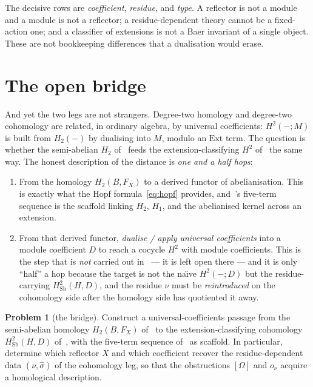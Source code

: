 \documentclass[11pt]{article}
\theoremstyle{definition}
\newtheorem{problem}[theorem]{Problem}
\newcommand{\Sb}{\mathrm{Sb}}
\newcommand{\shat}{\widehat{\sigma}}
\begin{document}
The decisive rows are \emph{coefficient}, \emph{residue}, and \emph{type}. A reflector is not
a module and a module is not a reflector; a residue-dependent theory cannot be a
fixed-action one; and a classifier of extensions is not a Baer invariant of a single object.
These are not bookkeeping differences that a dualisation would erase.

\section{The open bridge}\label{sec:bridge}

And yet the two legs are not strangers. Degree-two homology and degree-two cohomology are
related, in ordinary algebra, by universal coefficients: $H^2(-;M)$ is built from $H_2(-)$ by
dualising into $M$, modulo an $\mathrm{Ext}$ term. The question is whether the semi-abelian
$H_2$ of~\cite{GLV} feeds the extension-classifying $H^2$ of~\cite{RY} the same way. The
honest description of the distance is \emph{one and a half hops}:

\begin{enumerate}
\item[\textbf{Hop 1.}] From the homology $H_2(B,F_X)$ to a derived functor of abelianisation.
This is exactly what the Hopf formula~\eqref{eq:hopf} provides, and~\cite{GLV}'s five-term
sequence is the scaffold linking $H_2$, $H_1$, and the abelianised kernel across an extension.
\item[\textbf{Half a hop.}] From that derived functor, \emph{dualise / apply universal
coefficients} into a module coefficient $D$ to reach a cocycle $H^2$ with module
coefficients. This is the step that is \emph{not} carried out in~\cite{GLV} --- it is left
open there --- and it is only ``half'' a hop because the target is not the na\"\i ve
$H^2(-;D)$ but the residue-carrying $H^2_{\Sb}(H,D)$, and the residue $\nu$ must be
\emph{reintroduced} on the cohomology side after the homology side has quotiented it away.
\end{enumerate}

\begin{problem}[the bridge]\label{prob:bridge}
Construct a universal-coefficients passage from the semi-abelian homology $H_2(B,F_X)$
of~\cite{GLV} to the extension-classifying cohomology $H^2_{\Sb}(H,D)$ of~\cite{RY}, with the
five-term sequence of~\cite{GLV} as scaffold. In particular, determine which reflector $X$ and
which coefficient recover the residue-dependent data $(\nu,\shat)$ of the cohomology leg, so
that the obstructions $[\Omega]$ and $o_\nu$ acquire a homological description.
\end{problem}
\end{document}
